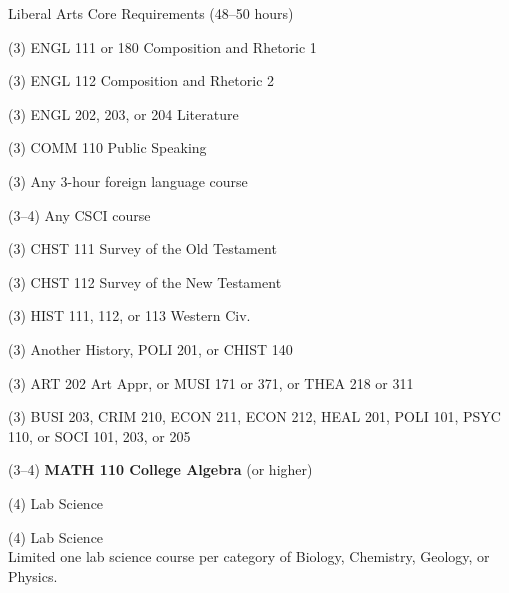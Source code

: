 \begin{reqgroup}{Liberal Arts Core Requirements (48--50 hours)}
\begin{checklist}
\begin{minipage}[t]{0.5\linewidth}
	\item (3) ENGL 111 or 180 Composition and Rhetoric 1
	\item (3) ENGL 112 Composition and Rhetoric 2
	\item (3) ENGL 202, 203, or 204 Literature
	\item (3) COMM 110 Public Speaking
	\item (3) Any 3-hour foreign language course
	\item (3--4) Any CSCI course
	\item (3) CHST 111  Survey of the Old Testament
	\item (3) CHST 112  Survey of the New Testament
	\item (3) HIST 111, 112, or 113 Western Civ.
\end{minipage}
\begin{minipage}[t]{0.5\linewidth}
	\item (3)	Another History, POLI 201, or CHIST 140
	\item (3)	ART 202 Art Appr, or MUSI 171 or 371, or THEA 218 or 311
	\item (3)	BUSI 203, CRIM 210, ECON 211, ECON 212, HEAL 201, POLI 101, PSYC 110, or SOCI 101, 203, or 205
	\item (3--4)	\textbf{MATH 110 College Algebra} (or higher)
	\item (4)	Lab Science
	\item (4)	Lab Science\\Limited one lab science course per category of Biology, Chemistry,
Geology, or Physics.
\end{minipage}
\end{checklist}
\end{reqgroup}


